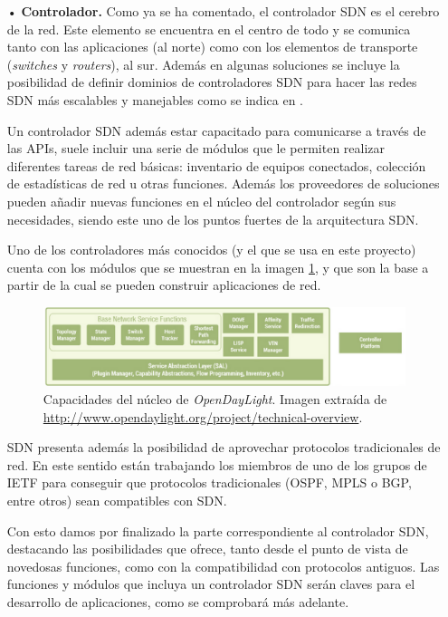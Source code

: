 \documentclass[a4paper,11pt]{book}
\begin{document}
\begin{itemize}
\item[•]\textbf{Controlador.} Como ya se ha comentado, el controlador \ac{SDN} es el cerebro de la red. Este elemento se encuentra en el centro de todo y se comunica tanto con las aplicaciones (al norte) como con los elementos de transporte (\textit{switches} y \textit{routers}), al sur. Además en algunas soluciones se incluye la posibilidad de definir dominios de controladores \ac{SDN} para hacer las redes \ac{SDN} más escalables y manejables como se indica en \nocite{SDNController}\cite{SDNController}. 

Un controlador \ac{SDN} además estar capacitado para comunicarse a través de las \ac{API}s, suele incluir una serie de módulos que le permiten realizar diferentes tareas de red básicas: inventario de equipos conectados, colección de estadísticas de red u otras funciones. Además los proveedores de soluciones pueden añadir nuevas funciones en el núcleo del controlador según sus necesidades, siendo este uno de los puntos fuertes de la arquitectura \ac{SDN}.

Uno de los controladores más conocidos (y el que se usa en este proyecto) cuenta con los módulos que se muestran en la imagen \ref{ODLFunctionCore}, y que son la base a partir de la cual se pueden construir aplicaciones de red.

\begin{figure}[tb]
	\centering
\includegraphics[scale=0.6]{./figuras/ODLFunctionCore}
\caption[Capacidades core \ac{ODL}.]{Capacidades del núcleo de \emph{OpenDayLight}. Imagen extraída de \url{http://www.opendaylight.org/project/technical-overview}.} \label{ODLFunctionCore}
	\end{figure}

\ac{SDN} presenta además la posibilidad de aprovechar protocolos tradicionales de red. En este sentido están trabajando los miembros de uno de los grupos de \ac{IETF} para conseguir que protocolos tradicionales (\ac{OSPF}, \ac{MPLS} o \ac{BGP}, entre otros) sean compatibles con \ac{SDN}. 

Con esto damos por finalizado la parte correspondiente al controlador \ac{SDN}, destacando las posibilidades que ofrece, tanto desde el punto de vista de novedosas funciones, como con la compatibilidad con protocolos antiguos. Las funciones y módulos que incluya un controlador \ac{SDN} serán claves para el desarrollo de aplicaciones, como se comprobará más adelante. 


\end{itemize}
\end{document}
